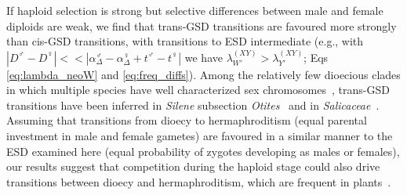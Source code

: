 \documentclass[10pt,letterpaper]{article}
\begin{document}
If haploid selection is strong but selective differences between male and female diploids are weak, we find that trans-GSD transitions are favoured more strongly than cis-GSD transitions, with transitions to ESD intermediate (e.g., with $|D^\male - D^\female| << |\alpha_\Delta^\male - \alpha_\Delta^\female + t^\male - t^\female|$ we have $\lambda_{W'}^{(XY)} > \lambda_{Y'}^{(XY)}$; Eqs \ref{eq:lambda_neoW} and \ref{eq:freq_diffs}). 
Among the relatively few dioecious clades in which multiple species have well characterized sex chromosomes~\cite{Ming:2011iy}, trans-GSD transitions have been inferred in \textit{Silene} subsection \textit{Otites}~\cite{Slancarova:2013dq} and in \textit{Salicaceae}~\cite{Pucholt2015,Pucholt2017}.
Assuming that transitions from dioecy to hermaphroditism (equal parental investment in male and female gametes) are favoured in a similar manner to the ESD examined here (equal probability of zygotes developing as males or females), our results suggest that competition during the haploid stage could also drive transitions between dioecy and hermaphroditism, which are frequent in plants~\cite{Kafer2017, Goldberg2017}.
\end{document}
